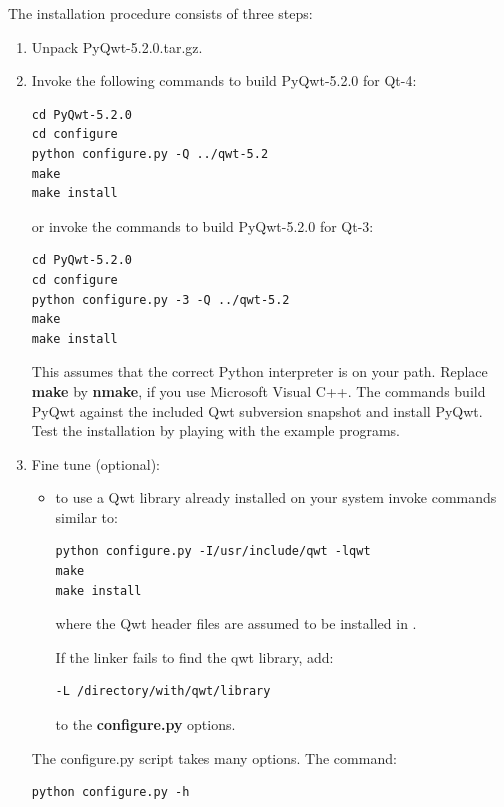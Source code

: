 \documentclass[a4paper,10pt,english]{manual}
\begin{document}
The installation procedure consists of three steps:
\begin{enumerate}
\item {} 
Unpack PyQwt-5.2.0.tar.gz.

\item {} 
Invoke the following commands to build PyQwt-5.2.0 for Qt-4:

\begin{Verbatim}[commandchars=@\[\]]
cd PyQwt-5.2.0
cd configure
python configure.py -Q ../qwt-5.2
make
make install
\end{Verbatim}

or invoke the commands to build PyQwt-5.2.0 for Qt-3:

\begin{Verbatim}[commandchars=@\[\]]
cd PyQwt-5.2.0
cd configure
python configure.py -3 -Q ../qwt-5.2
make
make install
\end{Verbatim}

This assumes that the correct Python interpreter is on your path. Replace
\textbf{make} by \textbf{nmake}, if you use Microsoft Visual C++.
The commands build PyQwt against the included Qwt subversion snapshot and
install PyQwt.
Test the installation by playing with the example programs.

\item {} 
Fine tune (optional):
\begin{itemize}
\item {} 
to use a Qwt library already installed on your system invoke
commands similar to:

\begin{Verbatim}[commandchars=@\[\]]
python configure.py -I/usr/include/qwt -lqwt
make
make install
\end{Verbatim}

where the Qwt header files are assumed to be installed in
.

If the linker fails to find the qwt library, add:

\begin{Verbatim}[commandchars=@\[\]]
-L /directory/with/qwt/library
\end{Verbatim}

to the \textbf{configure.py} options.

\end{itemize}

The configure.py script takes many options. The command:

\begin{Verbatim}[commandchars=@\[\]]
python configure.py -h
\end{Verbatim}


\end{enumerate}
\end{document}
